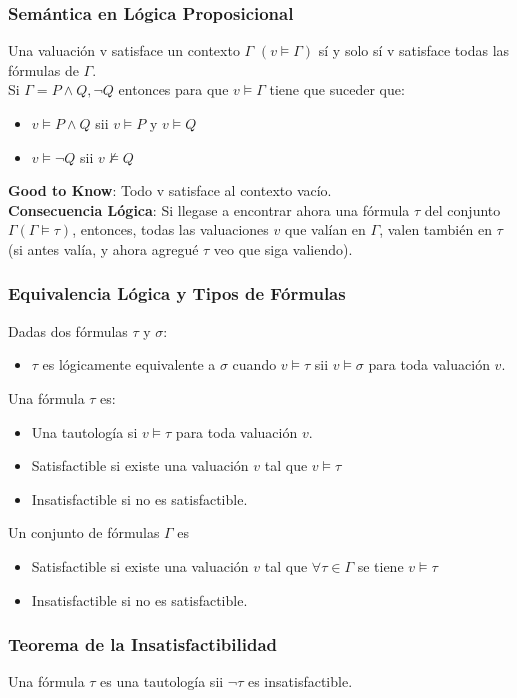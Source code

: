 \documentclass[10pt,a4paper]{article}
\begin{document}
\subsubsection*{Semántica en Lógica Proposicional}
Una valuación v satisface un contexto $\Gamma$ $(v \vDash \Gamma)$ sí y solo sí v satisface todas las fórmulas de $\Gamma$. \\
Si $\Gamma = P \land Q, \neg Q$ entonces para que $v \vDash \Gamma$ tiene que suceder que: 
\begin{itemize}
    \item $v \vDash P \land Q$ sii $v \vDash P$ y $v \vDash Q$
    \item $v \vDash \neg Q$ sii $v \nvDash Q$
\end{itemize}
\textbf{Good to Know}: Todo v satisface al contexto vacío. \\
\textbf{Consecuencia Lógica}: Si llegase a encontrar ahora una fórmula $\tau$ del conjunto $\Gamma (\Gamma \vDash \tau)$, entonces, todas las valuaciones $v$ que valían en $\Gamma$, valen también en $\tau$ (si antes valía, y ahora agregué $\tau$ veo que siga valiendo).
\subsubsection*{Equivalencia Lógica y Tipos de Fórmulas}
Dadas dos fórmulas $\tau$ y $\sigma$: 
\begin{itemize}
    \item $\tau$ es lógicamente equivalente a $\sigma$ cuando $v \vDash \tau$ sii $v \vDash \sigma$ para toda valuación $v$.
\end{itemize}
Una fórmula $\tau$ es: 
\begin{itemize}
    \item Una tautología si $v \vDash \tau$ para toda valuación $v$. 
    \item Satisfactible si existe una valuación $v$ tal que $v \vDash \tau$
    \item Insatisfactible si no es satisfactible.
\end{itemize}
Un conjunto de fórmulas $\Gamma$ es 
\begin{itemize}
    \item Satisfactible si existe una valuación $v$ tal que $\forall \tau \in \Gamma$ se tiene $v \vDash \tau$
    \item Insatisfactible si no es satisfactible.
\end{itemize}
\subsubsection*{Teorema de la Insatisfactibilidad}
Una fórmula $\tau$ es una tautología sii $\neg \tau$ es insatisfactible.
\end{document}
